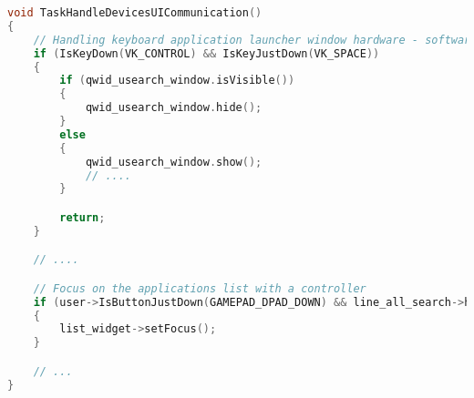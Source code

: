 \begin{lstlisting}[language=C++, style=cppstyle]
void TaskHandleDevicesUICommunication()
{
    // Handling keyboard application launcher window hardware - software communication
    if (IsKeyDown(VK_CONTROL) && IsKeyJustDown(VK_SPACE))
    {
        if (qwid_usearch_window.isVisible())
        {
            qwid_usearch_window.hide();
        }
        else
        {
            qwid_usearch_window.show();
            // ....
        }

        return;
    }

    // ....

    // Focus on the applications list with a controller
    if (user->IsButtonJustDown(GAMEPAD_DPAD_DOWN) && line_all_search->hasFocus())
    {
        list_widget->setFocus();
    }

    // ...
}
\end{lstlisting}

